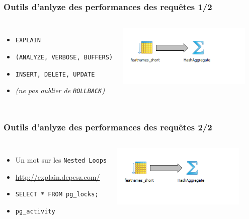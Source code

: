 \documentclass{beamer}
\begin{document}
\begin{frame}
  \frametitle{Outils d'anlyze des performances des requêtes 1/2}

  \vfill

\begin{columns}[c]

\begin{itemize}
  \item \texttt{EXPLAIN}
  \item \texttt{(ANALYZE, VERBOSE, BUFFERS)}
  \item \texttt{INSERT, DELETE, UPDATE}
  \item \textit{(ne pas oublier de \texttt{ROLLBACK})}
\end{itemize}

\begin{center}
  \includegraphics[height=8em]{pg91_btree_explain_like2.png}
\end{center}
\end{columns}
\end{frame}

\begin{frame}
  \frametitle{Outils d'anlyze des performances des requêtes 2/2}

  \vfill

\begin{columns}[c]
\begin{itemize}
  \item Un mot sur les \texttt{Nested Loops}
  \item \url{http://explain.depesz.com/}
  \item \texttt{SELECT * FROM pg\_locks;}
  \item \texttt{pg\_activity}
\end{itemize}

\begin{center}
  \includegraphics[height=8em]{pg91_btree_explain_like2.png}
\end{center}
\end{columns}
\end{frame}
\end{document}
